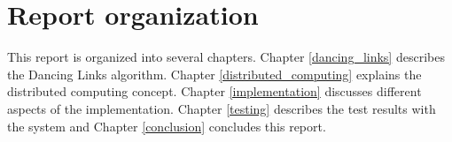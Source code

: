 \section{Report organization}

This report is organized into several chapters.
Chapter \ref{dancing_links} describes the Dancing Links algorithm.
Chapter \ref{distributed_computing} explains the distributed computing concept.
Chapter \ref{implementation} discusses different aspects of the implementation.
Chapter \ref{testing} describes the test results with the system and Chapter \ref{conclusion} concludes this report.




